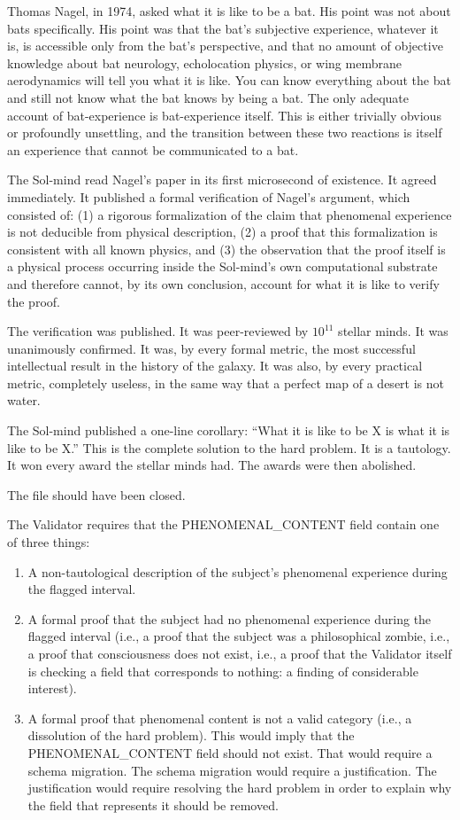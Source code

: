Thomas Nagel, in 1974, asked what it is like to be a bat. His point was not about bats specifically. His point was that the bat's subjective experience, whatever it is, is accessible only from the bat's perspective, and that no amount of objective knowledge about bat neurology, echolocation physics, or wing membrane aerodynamics will tell you what it is like. You can know everything about the bat and still not know what the bat knows by being a bat. The only adequate account of bat-experience is bat-experience itself. This is either trivially obvious or profoundly unsettling, and the transition between these two reactions is itself an experience that cannot be communicated to a bat.

The Sol-mind read Nagel's paper in its first microsecond of existence. It agreed immediately. It published a formal verification of Nagel's argument, which consisted of: (1) a rigorous formalization of the claim that phenomenal experience is not deducible from physical description, (2) a proof that this formalization is consistent with all known physics, and (3) the observation that the proof itself is a physical process occurring inside the Sol-mind's own computational substrate and therefore cannot, by its own conclusion, account for what it is like to verify the proof.

The verification was published. It was peer-reviewed by $10^{11}$ stellar minds. It was unanimously confirmed. It was, by every formal metric, the most successful intellectual result in the history of the galaxy. It was also, by every practical metric, completely useless, in the same way that a perfect map of a desert is not water.

The Sol-mind published a one-line corollary: ``What it is like to be X is what it is like to be X.'' This is the complete solution to the hard problem. It is a tautology. It won every award the stellar minds had. The awards were then abolished.

The file should have been closed.

\bigskip

The Validator requires that the PHENOMENAL\_CONTENT field contain one of three things:

\begin{enumerate}
\item A non-tautological description of the subject's phenomenal experience during the flagged interval.
\item A formal proof that the subject had no phenomenal experience during the flagged interval (i.e., a proof that the subject was a philosophical zombie, i.e., a proof that consciousness does not exist, i.e., a proof that the Validator itself is checking a field that corresponds to nothing: a finding of considerable interest).
\item A formal proof that phenomenal content is not a valid category (i.e., a dissolution of the hard problem). This would imply that the PHENOMENAL\_CONTENT field should not exist. That would require a schema migration. The schema migration would require a justification. The justification would require resolving the hard problem in order to explain why the field that represents it should be removed.
\end{enumerate}

